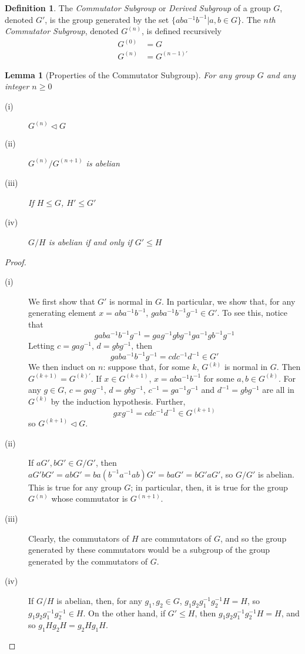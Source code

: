 \documentclass[12pt,leqno]{article}
\numberwithin{equation}{section}
\theoremstyle{plain}
\newtheorem{lem}[thm]{Lemma}
\theoremstyle{definition}
\newtheorem*{Def}{Definition}
\theoremstyle{remark}
\begin{document}
\begin{Def}
 The \textit{Commutator Subgroup} or \textit{Derived Subgroup} of a group $G$, denoted $G'$, is the group generated by the set $\{aba^{-1}b^{-1}|a,b\in G\}$. The \textit{$n$th Commutator Subgroup}, denoted $G^{(n)}$, is defined recursively \begin{align*}G^{(0)}&=G\\G^{(n)}&=G^{(n-1)'}\end{align*}
\end{Def}

\begin{lem}[Properties of the Commutator Subgroup]
 For any group $G$ and any integer $n\geq0$
\begin{description}
 \item [(i)] $G^{(n)}\lhd G$ 
 \item [(ii)] $G^{(n)}/G^{(n+1)}$ is abelian 
 \item [(iii)] If $H\leq G$, $H'\leq G'$
 \item [(iv)] $G/H$ is abelian if and only if $G'\leq H$
\end{description}
\end{lem}

\begin{proof}\indent
\begin{description}
 \item [(i)] We first show that $G'$ is normal in $G$. In particular, we show that, for any generating element $x=aba^{-1}b^{-1}$, $gaba^{-1}b^{-1}g^{-1}\in G'$. To see this, notice that \[gaba^{-1}b^{-1}g^{-1}=gag^{-1}gbg^{-1}ga^{-1}gb^{-1}g^{-1}\] Letting $c=gag^{-1}$, $d=gbg^{-1}$, then \[gaba^{-1}b^{-1}g^{-1}=cdc^{-1}d^{-1}\in G'\] We then induct on $n$: suppose that, for some $k$, $G^{(k)}$ is normal in $G$. Then $G^{(k+1)}=G^{(k)'}$. If $x\in G^{(k+1)}$, $x=aba^{-1}b^{-1}$ for some $a,b\in G^{(k)}$. For any $g\in G$, $c=gag^{-1}$, $d=gbg^{-1}$, $c^{-1}=ga^{-1}g^{-1}$ and $d^{-1}=gbg^{-1}$ are all in $G^{(k)}$ by the induction hypothesis. Further, \[gxg^{-1}=cdc^{-1}d^{-1}\in G^{(k+1)}\] so $G^{(k+1)}\lhd G$.
 \item [(ii)] If $aG',bG'\in G/G'$, then $aG'bG'=abG'=ba(b^{-1}a^{-1}ab)G'=baG'=bG'aG'$, so $G/G'$ is abelian. This is true for any group $G$; in particular, then, it is true for the group $G^{(n)}$ whose commutator is $G^{(n+1)}$.
 \item [(iii)] Clearly, the commutators of $H$ are commutators of $G$, and so the group generated by these commutators would be a subgroup of the group generated by the commutators of $G$.
 \item [(iv)] If $G/H$ is abelian, then, for any $g_1,g_2\in G$, $g_1g_2g_1^{-1}g_2^{-1}H=H$, so $g_1g_2g_1^{-1}g_2^{-1}\in H$. On the other hand, if $G'\leq H$, then $g_1g_2g_1^{-1}g_2^{-1}H=H$, and so $g_1Hg_2H=g_2Hg_1H$.\qedhere
\end{description}
\end{proof}
\end{document}
